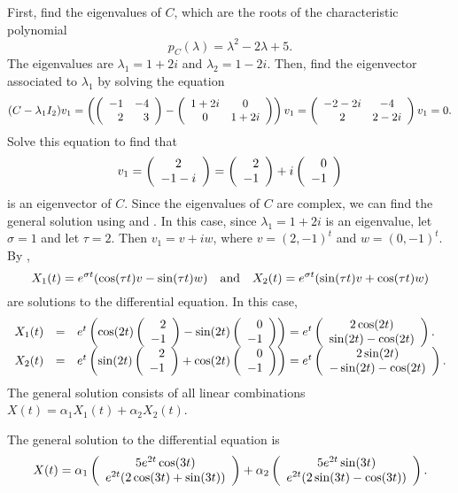 \soln First, find the eigenvalues of $C$, which are the roots of the
characteristic polynomial
\[
p_C(\lambda) = \lambda^2 - 2\lambda + 5.
\]
The eigenvalues are $\lambda_1 = 1 + 2i$ and $\lambda_2 = 1 - 2i$.  Then,
find the eigenvector associated to $\lambda_1$ by solving the equation
\[
(C - \lambda_1I_2)v_1 =
\left(\left(\begin{array}{rr} -1 & -4\\ 2 &3\end{array}\right) - \left(\begin{array}{cc} 1 + 2i & 0\\ 0 &1 + 2i\end{array}\right)\right)v_1
= \left(\begin{array}{cc} -2 - 2i & -4\\ 2 &2 - 2i\end{array}\right)v_1 = 0.
\]
Solve this equation to find that
\[
v_1 = \left(\begin{array}{c} 2 \\ -1 - i\end{array}\right) = \left(\begin{array}{r} 2 \\ -1\end{array}\right) + i\left(\begin{array}{r} 0 \\ -1\end{array}\right)
\]
is an eigenvector of $C$.  Since the eigenvalues of $C$ are complex, we
can find the general solution using  and .  In this
case, since $\lambda_1 = 1 + 2i$ is an eigenvalue, let $\sigma = 1$ and
let $\tau = 2$.  Then $v_1 = v + iw$, where $v = (2,-1)^t$ and
$w = (0,-1)^t$.  By ,
\[
X_1(t) = e^{\sigma t}(\cos(\tau t)v - \sin(\tau t)w) \quad\mbox{and}\quad
X_2(t) = e^{\sigma t}(\sin(\tau t)v + \cos(\tau t)w)
\]
are solutions to the differential equation.  In this case,
\[
\begin{array}{rcl}
X_1(t) & = & e^t\left(\cos(2t)\left(\begin{array}{r} 2 \\ -1\end{array}\right) -
\sin(2t)\left(\begin{array}{r} 0 \\ -1\end{array}\right)\right)
= e^t\left(\begin{array}{c} 2\cos(2t) \\ \sin(2t) - \cos(2t)\end{array}\right). \\
X_2(t) & = & e^t\left(\sin(2t)\left(\begin{array}{r} 2 \\ -1\end{array}\right) +
\cos(2t)\left(\begin{array}{r} 0 \\ -1\end{array}\right)\right)
= e^t\left(\begin{array}{c} 2\sin(2t) \\ -\sin(2t) - \cos(2t)\end{array}\right).
\end{array}
\]
The general solution consists of all linear combinations
$X(t) = \alpha_1X_1(t) + \alpha_2X_2(t)$.


\ans The general solution to the differential equation is
\[
X(t) =
\alpha_1\left(\begin{array}{c} 5e^{2t}\cos(3t) \\ e^{2t}(2\cos(3t) + \sin(3t))\end{array}\right) +
\alpha_2\left(\begin{array}{c} 5e^{2t}\sin(3t) \\ e^{2t}(2\sin(3t) - \cos(3t))\end{array}\right).
\]

